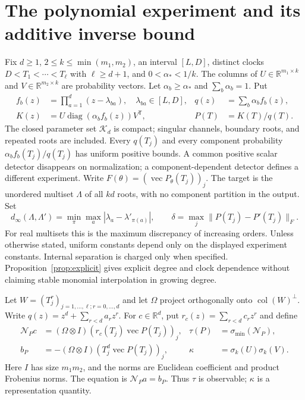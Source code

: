 \documentclass[11pt,reqno]{amsart}
\numberwithin{equation}{section}
\theoremstyle{definition}\newtheorem{definition}[theorem]{Definition}
\theoremstyle{remark}\newtheorem{remark}[theorem]{Remark}
\newcommand{\R}{\mathbb R}
\newcommand{\diag}{\operatorname{diag}}
\newcommand{\cK}{\mathcal K}
\newcommand{\cN}{\mathcal N}
\begin{document}
\section{The polynomial experiment and its additive inverse bound}
\label{sec:model-v94}
Fix $d\ge1$, $2\le k\le\min(m_1,m_2)$, an interval $[L,D]$,
distinct clocks $D<T_1<\cdots<T_\ell$ with $\ell\ge d+1$,
and $0<\alpha_*<1/k$. The columns of
$U\in\R^{m_1\times k}$ and $V\in\R^{m_2\times k}$ are probability
vectors. Let $\alpha_b\ge\alpha_*$ and $\sum_b\alpha_b=1$. Put
\begin{align}
 f_b(z)&=\prod_{a=1}^d(z-\lambda_{ba}),\quad \lambda_{ba}\in[L,D],
 &q(z)&=\sum_b\alpha_b f_b(z),\nonumber\\
 K(z)&=U\diag(\alpha_b f_b(z))V^{\mathsf T},
 &P(T)&=K(T)/q(T).\label{eq:model}
\end{align}
The closed parameter set $\cK_d$ is compact; singular channels,
boundary roots, and repeated roots are included. Every $q(T_j)$
and every component probability $\alpha_bf_b(T_j)/q(T_j)$ has
uniform positive bounds. A common positive scalar detector disappears
on normalization; a component-dependent detector defines a different
experiment. Write $F(\theta)=(\operatorname{vec}P_\theta(T_j))_j$.
The target is the unordered multiset $\Lambda$ of all $kd$ roots,
with no component partition in the output. Set
\[
 d_\infty(\Lambda,\Lambda')=\min_\pi\max_a
          |\lambda_a-\lambda'_{\pi(a)}|,
 \qquad \delta=\max_j\|P(T_j)-P'(T_j)\|_F.
\]
For real multisets this is the maximum discrepancy of increasing
orders. Unless otherwise stated, uniform constants depend only on
the displayed experiment constants. Internal separation is charged
only when specified. Proposition~\ref{prop:explicit} gives explicit
degree and clock dependence without claiming stable monomial
interpolation in growing degree.

Let $W=(T_j^r)_{j=1,\ldots,\ell;r=0,\ldots,d}$ and let $\Omega$
project orthogonally onto $\operatorname{col}(W)^\perp$.
Write $q(z)=z^d+\sum_{r<d}a_rz^r$. For $c\in\R^d$, put
$r_c(z)=\sum_{r<d}c_rz^r$ and define
\begin{align}
 \cN_Pc&=(\Omega\otimes I)
              (r_c(T_j)\operatorname{vec}P(T_j))_j,
 &\tau(P)&=\sigma_{\min}(\cN_P),\nonumber\\
 b_P&=-(\Omega\otimes I)
              (T_j^d\operatorname{vec}P(T_j))_j,
 &\kappa&=\sigma_k(U)\sigma_k(V).\label{eq:normalization}
\end{align}
Here $I$ has size $m_1m_2$, and the norms are Euclidean coefficient
and product Frobenius norms. The equation is $\cN_Pa=b_P$.
Thus $\tau$ is observable; $\kappa$ is a representation quantity.
\end{document}
